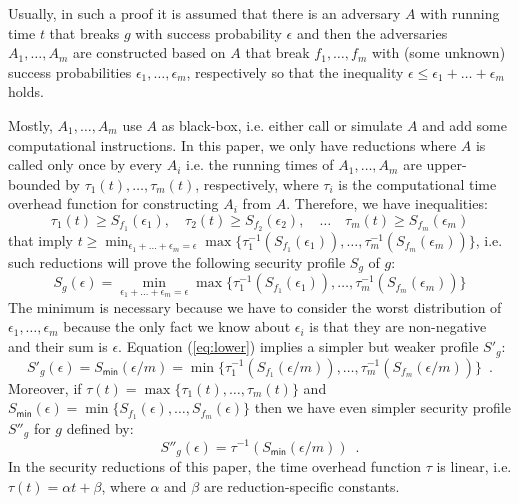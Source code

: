 \documentclass{article}
\begin{document}
Usually, in such a proof it is assumed that there is an adversary $A$ with running time $t$ that breaks $g$ with success probability $\epsilon$ and then the adversaries $A_1,\ldots, A_m$ are constructed based on $A$ that break $f_1,\ldots,f_m$ with (some unknown) success probabilities $\epsilon_1,\ldots,\epsilon_m$, respectively so that the inequality $\epsilon\le \epsilon_1 + \ldots + \epsilon_m$ holds.

Mostly, $A_1, \ldots, A_m$ use $A$ as black-box, i.e. either call or simulate $A$ and add some computational instructions. In this paper, we only have reductions where $A$ is called only once by every $A_i$ i.e. the running times of $A_1,\ldots,A_m$ are upper-bounded by $\tau_1(t), \ldots, \tau_m(t)$, respectively, where $\tau_i$ is the computational time overhead function for constructing $A_i$ from $A$.
Therefore, we have inequalities:
\[
\tau_1(t) \ge S_{f_1}(\epsilon_1), \quad \tau_2(t) \ge S_{f_2}(\epsilon_2), \quad \ldots\quad
\tau_m(t)\ge S_{f_m}(\epsilon_m)
\]
that imply $t\ge \min_{\epsilon_1 + \ldots + \epsilon_m = \epsilon}\max\{\tau^{-1}_1(S_{f_1}(\epsilon_1)), \ldots, \tau^{-1}_m(S_{f_m}(\epsilon_m))\}$, i.e. such reductions will prove the following security profile $S_g$ of $g$:
\begin{equation}\label{eq:lower}
S_g(\epsilon) = \min_{\epsilon_1 + \ldots + \epsilon_m = \epsilon}\max\{\tau^{-1}_1(S_{f_1}(\epsilon_1)), \ldots, \tau^{-1}_m(S_{f_m}(\epsilon_m))\}
\end{equation}
The minimum is necessary because we have to consider the worst distribution of $\epsilon_1,\ldots, \epsilon_m$ because the only fact we know about $\epsilon_i$ is that they are non-negative and their sum is $\epsilon$.
Equation (\ref{eq:lower}) implies a simpler but weaker profile $S'_g$:
\[
S'_g(\epsilon) = S_\mathsf{min}(\epsilon /m) =
 \min\{\tau^{-1}_1(S_{f_1}(\epsilon/m)), \ldots, \tau^{-1}_m(S_{f_m}(\epsilon/m))\}\enspace.
\]
Moreover, if $\tau(t)=\max\{\tau_1(t), \ldots, \tau_m(t)\}$ and $S_\mathsf{min}(\epsilon)= \min\{S_{f_1}(\epsilon), \ldots, S_{f_m}(\epsilon)\}$ then we have even simpler security profile $S''_g$ for $g$ defined by:
\begin{equation}\label{eq:losebound}
S''_g(\epsilon) = \tau^{-1}(S_\mathsf{min}(\epsilon/m))\enspace.
\end{equation}
In the security reductions of this paper, the time overhead function $\tau$ is linear, i.e. $\tau(t) = \alpha t + \beta$, where $\alpha$ and $\beta$ are reduction-specific constants.
\end{document}

